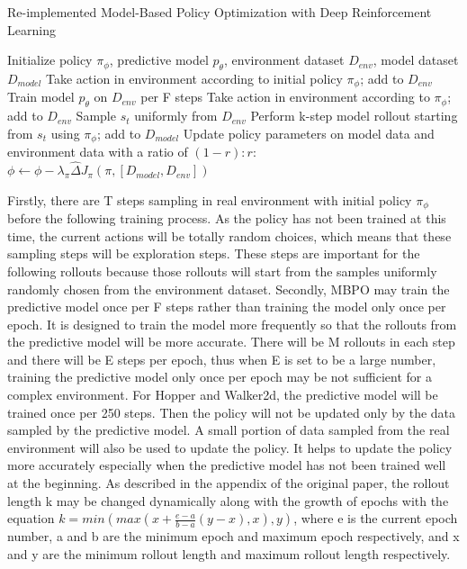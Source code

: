 \documentclass{article}
\begin{document}
\begin{algorithm}
\caption{Re-implemented Model-Based Policy Optimization with Deep Reinforcement Learning}\label{euclid}
\begin{algorithmic}[1]
\State Initialize policy $\pi_{\phi}$, predictive model $p_{\theta}$, environment dataset $D_{env}$, model dataset $D_{model}$
\State Take action in environment according to initial policy $\pi_{\phi}$; add to $D_{env}$
\EndFor
{}
\State Train model $p_{\theta}$ on $D_{env}$ per F steps
\State Take action in environment according to $\pi_{\phi}$; add to $D_{env}$
\State Sample $s_{t}$ uniformly from $D_{env}$
\State Perform k-step model rollout starting from $s_{t}$ using $\pi_{\phi}$; add to $D_{model}$
\EndFor
{}
\State Update policy parameters on model data and environment data with a ratio of $(1 - r) : r$: $\phi \leftarrow \phi - \lambda_{\pi} \hat{\Delta} J_{\pi}(\pi, [D_{model}, D_{env}])$
\EndFor
\EndFor
\EndFor
\end{algorithmic}
\end{algorithm}

Firstly, there are T steps sampling in real environment with initial policy $\pi_{\phi}$ before the following training process. As the policy has not been trained at this time, the current actions will be totally random choices, which means that these sampling steps will be exploration steps. These steps are important for the following rollouts because those rollouts will start from the samples uniformly randomly chosen from the environment dataset. Secondly, MBPO may train the predictive model once per F steps rather than training the model only once per epoch. It is designed to train the model more frequently so that the rollouts from the predictive model will be more accurate. There will be M rollouts in each step and there will be E steps per epoch, thus when E is set to be a large number, training the predictive model only once per epoch may be not sufficient for a complex environment. For Hopper and Walker2d, the predictive model will be trained once per 250 steps. Then the policy will not be updated only by the data sampled by the predictive model. A small portion of data sampled from the real environment will also be used to update the policy. It helps to update the policy more accurately especially when the predictive model has not been trained well at the beginning. As described in the appendix of the original paper, the rollout length k may be changed dynamically along with the growth of epochs with the equation $k = min(max(x + \frac{e-a}{b-a}(y-x), x), y)$, where e is the current epoch number, a and b are the minimum epoch and maximum epoch respectively, and x and y are the minimum rollout length and maximum rollout length respectively. 
\end{document}
